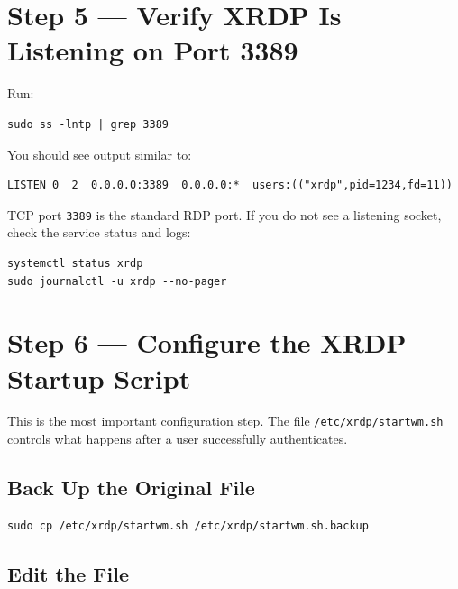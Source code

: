 \documentclass[a4paper,12pt]{article}
\newcommand{\code}[1]{\texttt{\small #1}}
\begin{document}
\section{Step 5 --- Verify XRDP Is Listening on Port 3389}

Run:

\begin{lstlisting}[style=bashstyle]
sudo ss -lntp | grep 3389
\end{lstlisting}

You should see output similar to:

\begin{lstlisting}[style=textstyle]
LISTEN 0  2  0.0.0.0:3389  0.0.0.0:*  users:(("xrdp",pid=1234,fd=11))
\end{lstlisting}

\begin{notebox}
TCP port \code{3389} is the standard RDP port. If you do not see a listening socket, check the service status and logs:

\begin{lstlisting}[style=bashstyle]
systemctl status xrdp
sudo journalctl -u xrdp --no-pager
\end{lstlisting}
\end{notebox}

\section{Step 6 --- Configure the XRDP Startup Script}

This is the most important configuration step. The file \code{/etc/xrdp/startwm.sh} controls what happens after a user successfully authenticates.

\subsection{Back Up the Original File}

\begin{lstlisting}[style=bashstyle]
sudo cp /etc/xrdp/startwm.sh /etc/xrdp/startwm.sh.backup
\end{lstlisting}

\subsection{Edit the File}
\end{document}
